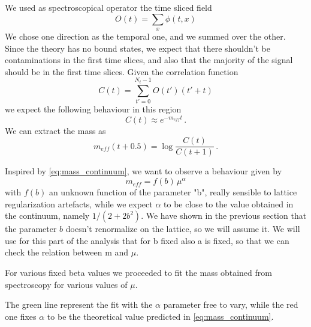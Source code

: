 \documentclass[12pt,a4paper]{report}
\begin{document}
We used as spectroscopical operator the time sliced field \begin{equation}
O(t) = \sum_x \phi(t,x)
\end{equation} We chose one direction as the temporal one, and we summed over the other. Since the theory has no bound states, we expect that there shouldn't be contaminations in the first time slices, and also that the majority of the signal should be in the first time slices. Given the correlation function \begin{equation}
C(t) = \sum_{t'=0}^{N_t-1} O(t') (t'+t) 
\end{equation} we expect the following behaviour in this region \begin{equation}
C(t) \approx e^{-m_{eff} t} \,.
\end{equation} We can extract the mass as \begin{equation}
m_{eff}(t+0.5) = \log \dfrac{C(t)}{C(t+1)} \,.
\end{equation}


Inspired by \eqref{eq:mass_continuum}, we want to observe a behaviour given by \begin{equation}
\label{eq:lattice_mass_scaling}
m_{eff}= f(b) \, \mu^\alpha
\end{equation} with $f(b)$  an unknown function of the parameter "b", really sensible to lattice regularization artefacts, while we expect $\alpha$ to be close to the value obtained in the continuum, namely $1/(2+2b^2)$. We have shown in the previous section that the parameter $b$ doesn't renormalize on the lattice, so we will assume it. We will use for this part of the analysis that for b fixed also a is fixed, so that we can check the relation between m and $\mu$.

For various fixed beta values we proceeded to fit the mass obtained from spectroscopy for various values of $\mu$.


The green line represent the fit with the $\alpha$ parameter free to vary, while the red one fixes $\alpha$ to be the theoretical value predicted in \eqref{eq:mass_continuum}.
\end{document}
